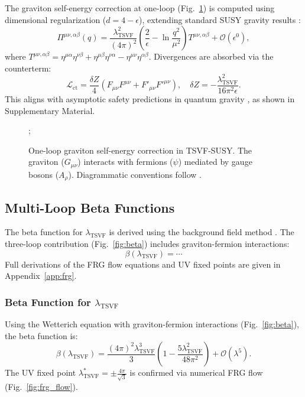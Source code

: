 \documentclass[twocolumn,superscriptaddress,floatfix]{revtex4-2}
\begin{document}
The graviton self-energy correction at one-loop (Fig.~\ref{fig:graviton_loop}) is computed using dimensional regularization ($d = 4 - \epsilon$), extending standard SUSY gravity results \cite{Ferrara1978}:  
\begin{equation}  
\Pi^{\mu\nu,\alpha\beta}(q) = \frac{\lambda_{\text{TSVF}}^2}{(4\pi)^2}\left(\frac{2}{\epsilon} - \ln\frac{q^2}{\mu^2}\right)T^{\mu\nu,\alpha\beta} + \mathcal{O}(\epsilon^0),  
\label{eq:graviton_self_energy}  
\end{equation}  
where \( T^{\mu\nu,\alpha\beta} = \eta^{\mu\alpha}\eta^{\nu\beta} + \eta^{\mu\beta}\eta^{\nu\alpha} - \eta^{\mu\nu}\eta^{\alpha\beta} \). Divergences are absorbed via the counterterm:  
\begin{equation}  
\mathcal{L}_{\text{ct}} = \frac{\delta Z}{4}(F_{\mu\nu}F^{\mu\nu} + F'_{\mu\nu}F'^{\mu\nu}), \quad \delta Z = -\frac{\lambda_{\text{TSVF}}^2}{16\pi^2\epsilon}.  
\label{eq:counterterm}  
\end{equation}  
This aligns with asymptotic safety predictions in quantum gravity \cite{Reuter1998}, as shown in Supplementary Material.  

\begin{figure}[!htbp]  
\centering  
{};  
\caption{One-loop graviton self-energy correction in TSVF-SUSY. The graviton ($G_{\mu\nu}$) interacts with fermions ($\psi$) mediated by gauge bosons ($A_\rho$). Diagrammatic conventions follow \cite{Peskin1995}.}  
\label{fig:graviton_loop}  
\end{figure}  

\subsection{Multi-Loop Beta Functions}  
The beta function for \(\lambda_{\text{TSVF}}\) is derived using the background field method \cite{Weinberg2009}. The three-loop contribution (Fig.~\ref{fig:beta}) includes graviton-fermion interactions:  
\begin{equation}  
\beta(\lambda_{\text{TSVF}}) = \cdots  
\end{equation}  
Full derivations of the FRG flow equations and UV fixed points are given in Appendix~\ref{app:frg}.   

\subsubsection{Beta Function for $\lambda_{\text{TSVF}}$}  
Using the Wetterich equation with graviton-fermion interactions (Fig.~\ref{fig:beta}), the beta function is:  
\begin{equation}  
\beta(\lambda_{\text{TSVF}}) = \frac{(4\pi)^2 \lambda_{\text{TSVF}}^3}{3} \left(1 - \frac{5\lambda_{\text{TSVF}}^2}{48\pi^2}\right) + \mathcal{O}(\lambda^5).  
\end{equation}  
The UV fixed point $\lambda_{\text{TSVF}}^* = \pm \frac{4\pi}{\sqrt{3}}$ is confirmed via numerical FRG flow (Fig.~\ref{fig:frg_flow}).  
\end{document}
